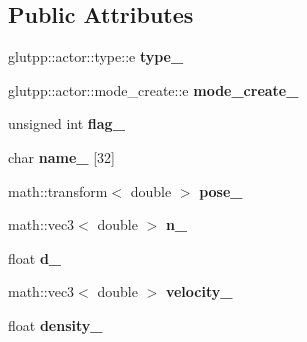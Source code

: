 \subsection*{\-Public \-Attributes}
\begin{DoxyCompactItemize}
\item 
\hypertarget{classglutpp_1_1actor_1_1raw_a08f89fb5941988cc6c3ba52cdd6133aa}{glutpp\-::actor\-::type\-::e {\bfseries type\-\_\-}}\label{classglutpp_1_1actor_1_1raw_a08f89fb5941988cc6c3ba52cdd6133aa}

\item 
\hypertarget{classglutpp_1_1actor_1_1raw_acec042d2aaa59655cdb23df1a82552ef}{glutpp\-::actor\-::mode\-\_\-create\-::e {\bfseries mode\-\_\-create\-\_\-}}\label{classglutpp_1_1actor_1_1raw_acec042d2aaa59655cdb23df1a82552ef}

\item 
\hypertarget{classglutpp_1_1actor_1_1raw_a55d3f6c19e283dbea4b1b936c62b7b93}{unsigned int {\bfseries flag\-\_\-}}\label{classglutpp_1_1actor_1_1raw_a55d3f6c19e283dbea4b1b936c62b7b93}

\item 
\hypertarget{classglutpp_1_1actor_1_1raw_ab8f930c6009c82262297bbbe44438028}{char {\bfseries name\-\_\-} \mbox{[}32\mbox{]}}\label{classglutpp_1_1actor_1_1raw_ab8f930c6009c82262297bbbe44438028}

\item 
\hypertarget{classglutpp_1_1actor_1_1raw_ac4a6917f7c3b193da24c03937d0b3c40}{math\-::transform$<$ double $>$ {\bfseries pose\-\_\-}}\label{classglutpp_1_1actor_1_1raw_ac4a6917f7c3b193da24c03937d0b3c40}

\item 
\hypertarget{classglutpp_1_1actor_1_1raw_ae68e773c3d16d941ab7e64961935450c}{math\-::vec3$<$ double $>$ {\bfseries n\-\_\-}}\label{classglutpp_1_1actor_1_1raw_ae68e773c3d16d941ab7e64961935450c}

\item 
\hypertarget{classglutpp_1_1actor_1_1raw_a25767c30241b29e73e09e68b35c2a8f2}{float {\bfseries d\-\_\-}}\label{classglutpp_1_1actor_1_1raw_a25767c30241b29e73e09e68b35c2a8f2}

\item 
\hypertarget{classglutpp_1_1actor_1_1raw_a79950ccb0dbcd7774191cd5dc7375a79}{math\-::vec3$<$ double $>$ {\bfseries velocity\-\_\-}}\label{classglutpp_1_1actor_1_1raw_a79950ccb0dbcd7774191cd5dc7375a79}

\item 
\hypertarget{classglutpp_1_1actor_1_1raw_a0285b6aeb5461103769b0f3f4ef0247a}{float {\bfseries density\-\_\-}}\label{classglutpp_1_1actor_1_1raw_a0285b6aeb5461103769b0f3f4ef0247a}


\end{DoxyCompactItemize}
